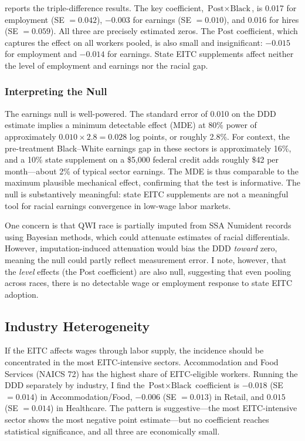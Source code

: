 \documentclass[12pt]{article}
\begin{document}


 reports the triple-difference results. The key coefficient, $\text{Post} \times \text{Black}$, is 0.017 for employment (SE $= 0.042$), $-0.003$ for earnings (SE $= 0.010$), and 0.016 for hires (SE $= 0.059$). All three are precisely estimated zeros. The $\text{Post}$ coefficient, which captures the effect on all workers pooled, is also small and insignificant: $-0.015$ for employment and $-0.014$ for earnings. State EITC supplements affect neither the level of employment and earnings nor the racial gap.

\subsubsection*{Interpreting the Null} The earnings null is well-powered. The standard error of 0.010 on the DDD estimate implies a minimum detectable effect (MDE) at 80\% power of approximately $0.010 \times 2.8 = 0.028$ log points, or roughly 2.8\%. For context, the pre-treatment Black--White earnings gap in these sectors is approximately 16\%, and a 10\% state supplement on a \$5,000 federal credit adds roughly \$42 per month---about 2\% of typical sector earnings. The MDE is thus comparable to the maximum plausible mechanical effect, confirming that the test is informative. The null is substantively meaningful: state EITC supplements are not a meaningful tool for racial earnings convergence in low-wage labor markets.

One concern is that QWI race is partially imputed from SSA Numident records using Bayesian methods, which could attenuate estimates of racial differentials. However, imputation-induced attenuation would bias the DDD \textit{toward} zero, meaning the null could partly reflect measurement error. I note, however, that the \textit{level} effects (the Post coefficient) are also null, suggesting that even pooling across races, there is no detectable wage or employment response to state EITC adoption.

\subsection{Industry Heterogeneity}

If the EITC affects wages through labor supply, the incidence should be concentrated in the most EITC-intensive sectors. Accommodation and Food Services (NAICS 72) has the highest share of EITC-eligible workers. Running the DDD separately by industry, I find the $\text{Post} \times \text{Black}$ coefficient is $-0.018$ (SE $= 0.014$) in Accommodation/Food, $-0.006$ (SE $= 0.013$) in Retail, and $0.015$ (SE $= 0.014$) in Healthcare. The pattern is suggestive---the most EITC-intensive sector shows the most negative point estimate---but no coefficient reaches statistical significance, and all three are economically small.
\end{document}
